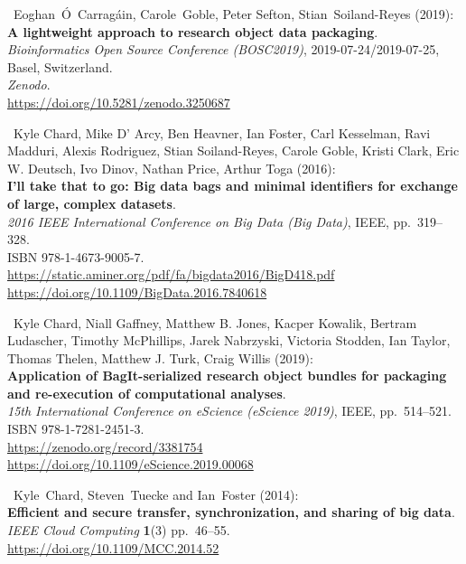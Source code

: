 \begin{thebibliography}{9}
~Eoghan~Ó~Carragáin, Carole~Goble, Peter Sefton,
Stian~Soiland-Reyes (2019):\\
\textbf{A lightweight approach to research object data packaging}.\\
\emph{Bioinformatics Open Source Conference (BOSC2019)},
2019-07-24/2019-07-25, Basel, Switzerland.\\
\emph{Zenodo}.\\
\url{https://doi.org/10.5281/zenodo.3250687}

~Kyle Chard, Mike D' Arcy, Ben Heavner, Ian Foster, Carl
Kesselman, Ravi Madduri, Alexis Rodriguez, Stian Soiland-Reyes, Carole
Goble, Kristi Clark, Eric W. Deutsch, Ivo Dinov, Nathan Price, Arthur
Toga (2016):\\
\textbf{I'll take that to go: Big data bags and minimal identifiers for
exchange of large, complex datasets}.\\
\emph{2016 IEEE International Conference on Big Data (Big Data)}, IEEE,
pp.~319--328.\\
ISBN 978-1-4673-9005-7.\\
\url{https://static.aminer.org/pdf/fa/bigdata2016/BigD418.pdf}~\\
\url{https://doi.org/10.1109/BigData.2016.7840618}

~Kyle Chard, Niall Gaffney, Matthew B. Jones, Kacper Kowalik,
Bertram Ludascher, Timothy McPhillips, Jarek Nabrzyski, Victoria
Stodden, Ian Taylor, Thomas Thelen, Matthew J. Turk, Craig Willis
(2019):\\
\textbf{Application of BagIt-serialized research object bundles for
packaging and re-execution of computational analyses}.\\
\emph{15th International Conference on eScience (eScience 2019)}, IEEE,
pp.~514--521.\\
ISBN 978-1-7281-2451-3.\\
\url{https://zenodo.org/record/3381754}~\\
\url{https://doi.org/10.1109/eScience.2019.00068}

~Kyle~Chard, Steven~Tuecke and Ian~Foster (2014):\\
\textbf{Efficient and secure transfer, synchronization, and sharing of
big data}.\\
\emph{IEEE Cloud Computing} \textbf{1}(3) pp.~46--55.\\
\url{https://doi.org/10.1109/MCC.2014.52}


\end{thebibliography}
